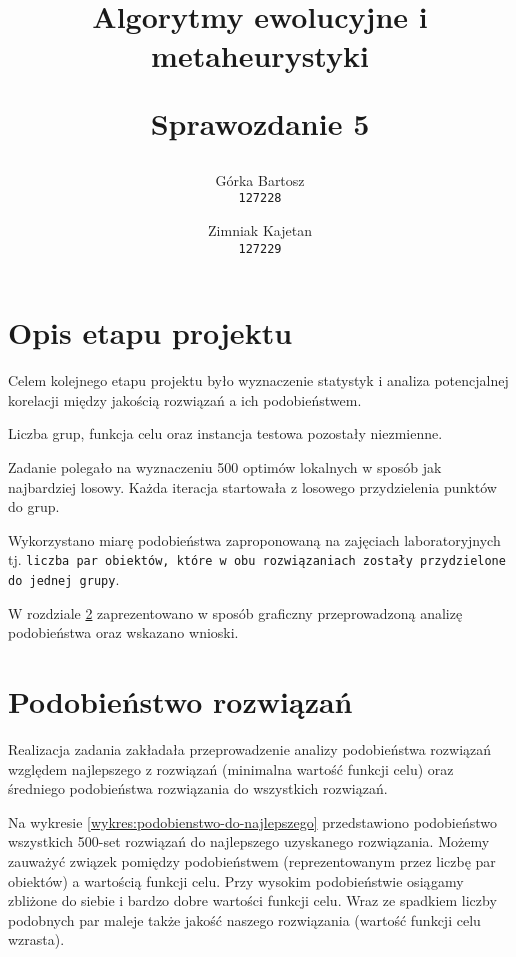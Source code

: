 \documentclass[main.tex]{subfiles}
\begin{document}
\title{
    \textbf{Algorytmy ewolucyjne i metaheurystyki}\\
    \begin{large}
        Sprawozdanie 5
    \end{large}
}

\author{
    Górka Bartosz\\
  \texttt{127228}
  \and
  Zimniak Kajetan\\
  \texttt{127229}
}

\date{}

\maketitle

\section{Opis etapu projektu}
Celem kolejnego etapu projektu było wyznaczenie statystyk i analiza potencjalnej korelacji między jakością rozwiązań a ich podobieństwem.

Liczba grup, funkcja celu oraz instancja testowa pozostały niezmienne.

Zadanie polegało na wyznaczeniu 500 optimów lokalnych w sposób jak najbardziej losowy. Każda iteracja startowała z losowego przydzielenia punktów do grup.

Wykorzystano miarę podobieństwa zaproponowaną na zajęciach laboratoryjnych tj. \texttt{liczba par obiektów, które w obu rozwiązaniach zostały przydzielone do jednej grupy}.

W rozdziale \ref{section:podobienstwo} zaprezentowano w sposób graficzny przeprowadzoną analizę podobieństwa oraz wskazano wnioski.

\section{Podobieństwo rozwiązań}
\label{section:podobienstwo}
Realizacja zadania zakładała przeprowadzenie analizy podobieństwa rozwiązań względem najlepszego z rozwiązań (minimalna wartość funkcji celu) oraz średniego podobieństwa rozwiązania do wszystkich rozwiązań.

Na wykresie \ref{wykres:podobienstwo-do-najlepszego} przedstawiono podobieństwo wszystkich 500-set rozwiązań do najlepszego uzyskanego rozwiązania. Możemy zauważyć związek pomiędzy podobieństwem (reprezentowanym przez liczbę par obiektów) a wartością funkcji celu. Przy wysokim podobieństwie osiągamy zbliżone do siebie i bardzo dobre wartości funkcji celu. Wraz ze spadkiem liczby podobnych par maleje także jakość naszego rozwiązania (wartość funkcji celu wzrasta).
\end{document}
